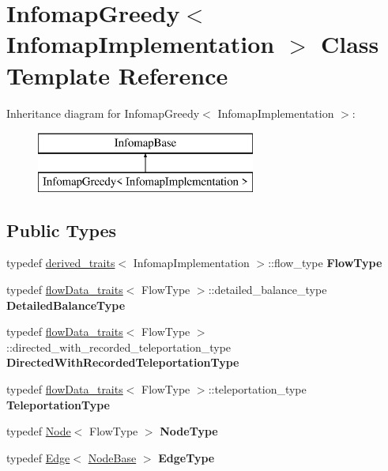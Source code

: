 \hypertarget{classInfomapGreedy}{}\section{Infomap\+Greedy$<$ Infomap\+Implementation $>$ Class Template Reference}
\label{classInfomapGreedy}
Inheritance diagram for Infomap\+Greedy$<$ Infomap\+Implementation $>$\+:\begin{figure}[H]
\begin{center}
\leavevmode
\includegraphics[height=2.000000cm]{classInfomapGreedy}
\end{center}
\end{figure}
\subsection*{Public Types}
\begin{DoxyCompactItemize}
\item 
\mbox{\label{classInfomapGreedy_a26946b4543a062c5aa9562aa9d173604}} 
typedef \mbox{\hyperlink{structderived__traits}{derived\+\_\+traits}}$<$ Infomap\+Implementation $>$\+::flow\+\_\+type {\bfseries Flow\+Type}
\item 
\mbox{\label{classInfomapGreedy_a1183efde6aeba9e84d3b58d3ef9fc501}} 
typedef \mbox{\hyperlink{structflowData__traits}{flow\+Data\+\_\+traits}}$<$ Flow\+Type $>$\+::detailed\+\_\+balance\+\_\+type {\bfseries Detailed\+Balance\+Type}
\item 
\mbox{\label{classInfomapGreedy_af0cdcb030bea05e21b00fccdadb2311d}} 
typedef \mbox{\hyperlink{structflowData__traits}{flow\+Data\+\_\+traits}}$<$ Flow\+Type $>$\+::directed\+\_\+with\+\_\+recorded\+\_\+teleportation\+\_\+type {\bfseries Directed\+With\+Recorded\+Teleportation\+Type}
\item 
\mbox{\label{classInfomapGreedy_a0a6501d0b50513b09d1067a0389ddcd5}} 
typedef \mbox{\hyperlink{structflowData__traits}{flow\+Data\+\_\+traits}}$<$ Flow\+Type $>$\+::teleportation\+\_\+type {\bfseries Teleportation\+Type}
\item 
\mbox{\label{classInfomapGreedy_a4f8feee3326cf749904ed392f5c6bbfe}} 
typedef \mbox{\hyperlink{classNode}{Node}}$<$ Flow\+Type $>$ {\bfseries Node\+Type}
\item 
\mbox{\label{classInfomapGreedy_aaf8eb913e5a12c583b95a2589e5bcc09}} 
typedef \mbox{\hyperlink{classEdge}{Edge}}$<$ \mbox{\hyperlink{classNodeBase}{Node\+Base}} $>$ {\bfseries Edge\+Type}
\end{DoxyCompactItemize}
